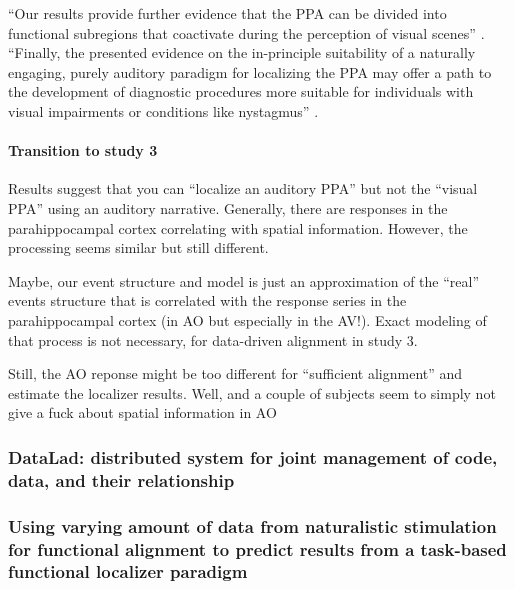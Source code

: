 %
``Our results provide further evidence that the PPA can be divided into
functional subregions that coactivate during the perception of visual scenes''
\citep{haeusler2022processing}.
%
``Finally, the presented evidence on the in-principle suitability of a naturally
engaging, purely auditory paradigm for localizing the PPA may offer a path to
the development of diagnostic procedures more suitable for individuals with
visual impairments or conditions like nystagmus''
\citep{haeusler2022processing}.


\paragraph{Transition to study 3}

%
Results suggest that you can ``localize an auditory PPA'' but not the ``visual
PPA'' using an auditory narrative.
%
Generally, there are responses in the parahippocampal cortex correlating with
spatial information.
%
However, the processing seems similar but still different.

%
Maybe, our event structure and model is just an approximation of the ``real''
events structure that is correlated with the response series in the
parahippocampal cortex (in AO but especially in the AV!).
%
Exact modeling of that process is not necessary, for data-driven alignment in
study 3.

%
Still, the AO reponse might be too different for ``sufficient alignment'' and
estimate the localizer results.
%
Well, and a couple of subjects seem to simply not give a fuck about spatial
information in AO


\subsubsection{DataLad: distributed system for joint management of code, data,
and their relationship}



\subsubsection{Using varying amount of data from naturalistic stimulation for
functional alignment to predict results from a task-based functional localizer
paradigm}



